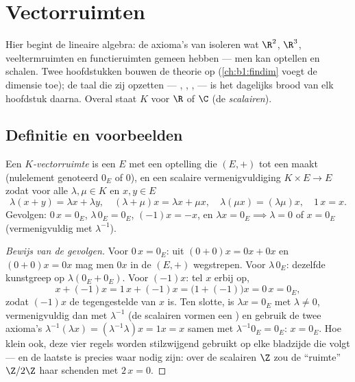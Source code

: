 \chapter{Vectorruimten}\label{ch:b1:vspaces}

Hier begint de lineaire algebra: de axioma's van 
isoleren wat $\R^2$, $\R^3$, veeltermruimten en functieruimten
gemeen hebben --- men kan optellen en schalen. Twee hoofdstukken
bouwen de theorie op (\cref{ch:b1:findim} voegt de dimensie toe); de
taal die zij opzetten --- , , ,  --- is het dagelijks brood van elk hoofdstuk daarna. Overal
staat $K$ voor $\R$ of $\C$ (de \emph{scalairen}).

\section{Definitie en voorbeelden}

\begin{definition}[Vectorruimte]\label{def:b1:vspaces:def}
Een \emph{$K$-vectorruimte} is een 
$E$ met een optelling die $(E, +)$ tot een  maakt
(nulelement genoteerd $0_E$ of $0$), en een scalaire
vermenigvuldiging $K \times E \to E$ zodat voor alle $\lambda, \mu
\in K$ en $x, y \in E$
\[
\lambda(x + y) = \lambda x + \lambda y,\quad
(\lambda + \mu) x = \lambda x + \mu x,\quad
\lambda(\mu x) = (\lambda\mu) x,\quad
1\,x = x .
\]
Gevolgen: $0\,x = 0_E$, $\lambda\,0_E = 0_E$, $(-1)x = -x$, en
$\lambda x = 0_E \implies \lambda = 0$ of $x = 0_E$ (vermenigvuldig
met $\lambda^{-1}$).
\end{definition}

\begin{proof}[Bewijs van de gevolgen]
Voor $0\,x = 0_E$: uit $(0 + 0)x = 0x + 0x$ en $(0+0)x = 0x$ mag
men $0x$ in de  $(E, +)$ wegstrepen. Voor $\lambda\,0_E$:
dezelfde kunstgreep op $\lambda(0_E + 0_E)$. Voor $(-1)x$: tel $x$
erbij op,
\[
x + (-1)x = 1\,x + (-1)x = \bigl(1 + (-1)\bigr)x = 0\,x = 0_E ,
\]
zodat $(-1)x$ de tegengestelde van $x$ is. Ten slotte, is $\lambda
x = 0_E$ met $\lambda \neq 0$, vermenigvuldig dan met
$\lambda^{-1}$ (de scalairen vormen een ) en gebruik de twee
axioma's $\lambda^{-1}(\lambda x) = (\lambda^{-1}\lambda)x = 1x =
x$ samen met $\lambda^{-1}0_E = 0_E$: $x = 0_E$. Hoe klein ook,
deze vier regels worden stilzwijgend gebruikt op elke bladzijde
die volgt --- en de laatste is precies waar  nodig zijn:
over de scalairen $\Z$ zou de ``ruimte'' $\Z/2\Z$ haar schenden
met $2\,x = 0$.
\end{proof}

